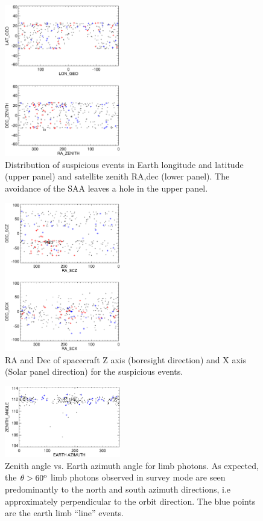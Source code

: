 \documentclass[aps,twocolumn,prd,superscriptaddress,showpacs,nofootinbib,fixfloat]{revtex4}
\newcommand{\degree}{^{\rm o}}
\begin{document}
\begin{figure}
\centering
\includegraphics[width=0.45\textwidth]{plots/geo-lonlat.ps}
\caption{Distribution of suspicious events in Earth longitude and latitude
(upper panel) and satellite zenith RA,dec (lower panel).   The
avoidance of the SAA leaves a hole in the upper panel.}
\label{fig:geo-lonlat}
\end{figure}

\begin{figure}
\centering
\includegraphics[width=0.45\textwidth]{plots/spacecraft-zx.ps}
\caption{RA and Dec of spacecraft Z axis (boresight direction) and X axis
(Solar panel direction) for the suspicious events.
}
\label{fig:spacecraft-zx}
\end{figure}

\begin{figure}
\centering
\includegraphics[width=0.45\textwidth]{plots/earth-az.ps}
\caption{Zenith angle vs. Earth azimuth angle for limb photons.  As expected,
  the $\theta > 60\degree$ limb photons observed in survey mode are seen
  predominantly to the north and south azimuth directions, i.e approximately
  perpendicular to the orbit direction. The blue points are the earth limb ``line'' events. }
\label{fig:earth-az}
\end{figure}
\end{document}
